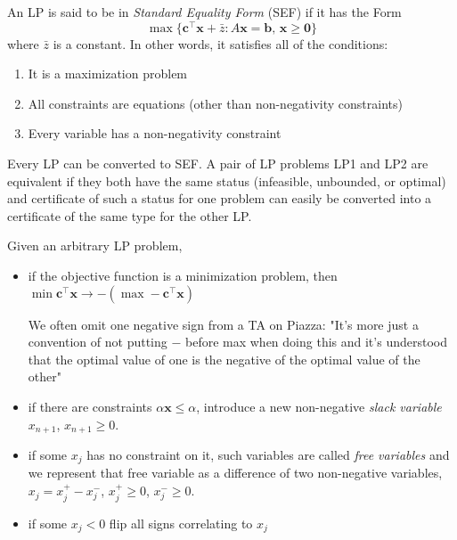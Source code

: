 \begin{defbox}
    \begin{definition}
        An LP is said to be in \emph{Standard Equality Form} (SEF) if it has the Form
        \[ \max \{\bm{c}^\top \bm{x}+\bar{z} : A \bm{x}=\bm{b},\,\bm{x}\geqslant  \bm{0}\}\]
        where $ \bar{z} $ is a constant.
        In other words, it satisfies all of the conditions:
        \begin{enumerate}[(1)]
            \item It is a maximization problem
            \item All constraints are equations (other than non-negativity
                  constraints)
            \item Every variable has a non-negativity constraint
        \end{enumerate}
    \end{definition}
\end{defbox}
Every LP can be converted to SEF. A pair of LP problems LP1 and LP2 are equivalent if they both have the
same status (infeasible, unbounded, or optimal) and certificate of such a status for one problem can easily
be converted into a certificate of the same type for the other LP.

Given an arbitrary LP problem,
\begin{itemize}
    \item if the objective function is a minimization problem, then
          $\min \bm{c}^\top \bm{x}\rightarrow -(\max -\bm{c}^\top \bm{x})$
          \begin{remark}
              We often omit one negative sign
              from a TA on Piazza: "It's more just a convention of not putting $ - $
              before max when doing this and it's understood that the
              optimal value of one is the negative of the optimal value of the other"
          \end{remark}
    \item if there are constraints $\alpha\bm{x}\leqslant \alpha$, introduce a new
          non-negative \emph{slack variable} $x_{n+1}$, $x_{n+1}\geqslant  0$.
    \item if some $x_j$ has no constraint on it, such variables are called \emph{free variables} and
          we represent that free variable as a difference of two non-negative variables,
          $x_j=x_j^+-x_j^-$, $x_j^+\geqslant  0$, $x_j^-\geqslant  0$.
    \item if some $x_j<0$ flip all signs correlating to $x_j$
\end{itemize}


